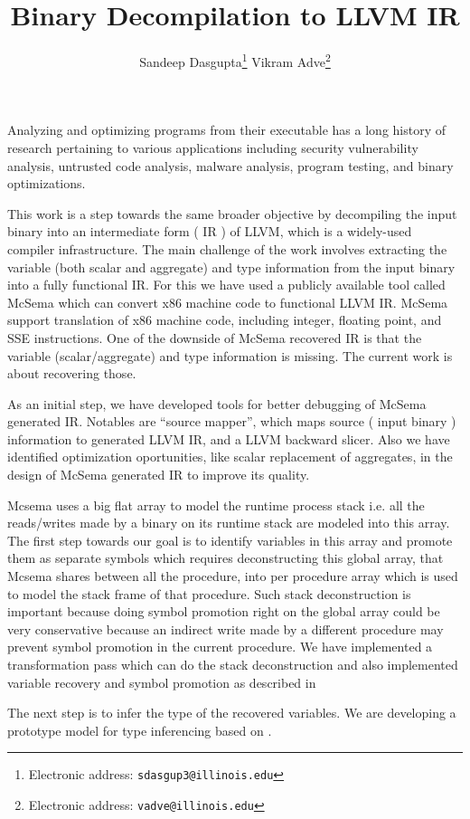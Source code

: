 \documentclass[10pt,twoside]{article}
\title{\textbf{ Binary Decompilation to LLVM IR}}
\author{Sandeep Dasgupta\thanks{Electronic address: \texttt{sdasgup3@illinois.edu}}
\qquad Vikram Adve\thanks{Electronic address: \texttt{vadve@illinois.edu}}
}
\begin{document}
\thispagestyle{empty}

\maketitle

Analyzing and optimizing programs from their executable has a long history of
research pertaining to various applications including  security vulnerability
analysis, untrusted code analysis, malware analysis, program testing, and
binary optimizations. 

This work is a step towards the same broader objective by decompiling the input binary
into an intermediate form ( IR ) of LLVM, which is a widely-used compiler
infrastructure.  The main challenge of the work involves extracting the
variable (both scalar and aggregate) and type information from the input binary
into a fully functional IR.  For this we have used a publicly available tool
called McSema \cite{Mcsema}  which can convert x86
machine code to functional LLVM IR. McSema support translation of x86 machine
code, including integer, floating point, and SSE instructions. One of the
downside of McSema recovered IR is that the variable (scalar/aggregate)
and type information is missing. The current work is about recovering those.

As an initial step, we have developed tools \cite{SourceMapper} for better
debugging of McSema generated IR.  Notables are ``source mapper'', which maps
source ( input binary ) information to generated LLVM IR, and a LLVM backward
slicer. Also we have identified optimization oportunities, like scalar
replacement of aggregates, in the design of McSema generated IR to improve its
quality. 

Mcsema uses a big flat array to model the runtime process stack i.e. all the
reads/writes made by a binary on its runtime stack are modeled into this array.
The first step towards our goal is to identify variables in this array and
promote them as separate symbols which requires deconstructing this global 
array, that Mcsema shares between all the procedure, into per procedure array
which is used to model the stack frame of that procedure.  Such stack deconstruction is important because 
doing symbol promotion right on the global array could be very conservative because
 an indirect write made by a different procedure may prevent
symbol promotion in the current procedure.  We have implemented a
transformation pass which can do the stack deconstruction and also implemented variable recovery
and symbol promotion as described in \cite{PLDI2013,Eurosys2013}

The next step is to infer the type of the recovered variables. 
We are developing a prototype model for type inferencing based on \cite{PLDI2013,PLDI2016}. 

\nocite{*}

\end{document}
